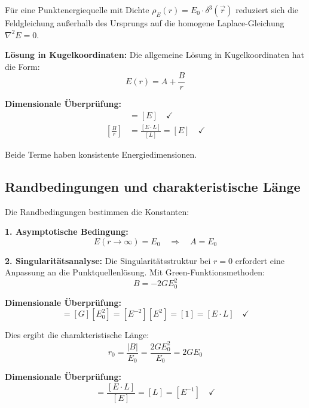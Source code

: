 \documentclass[12pt,a4paper]{report}
\newcommand{\rzero}{r_0}                  %
\begin{document}
	Für eine Punktenergiequelle mit Dichte $\rho_E(r) = E_0 \cdot \delta^3(\vec{r})$ reduziert sich die Feldgleichung außerhalb des Ursprungs auf die homogene Laplace-Gleichung $\nabla^2 E = 0$.
	
	\textbf{Lösung in Kugelkoordinaten:}
	Die allgemeine Lösung in Kugelkoordinaten hat die Form:
	\begin{equation}
		E(r) = A + \frac{B}{r}
		\label{eq:general_solution}
	\end{equation}
	
	\textbf{Dimensionale Überprüfung:}
	\begin{align}
		[A] &= [E] \quad \checkmark \\
		\left[\frac{B}{r}\right] &= \frac{[E \cdot L]}{[L]} = [E] \quad \checkmark
	\end{align}
	
	Beide Terme haben konsistente Energiedimensionen.
	
	\subsection{Randbedingungen und charakteristische Länge}
	\label{subsec:boundary_conditions}
	
	Die Randbedingungen bestimmen die Konstanten:
	
	\textbf{1. Asymptotische Bedingung:}
	\begin{equation}
		E(r \to \infty) = E_0 \quad \Rightarrow \quad A = E_0
	\end{equation}
	
	\textbf{2. Singularitätsanalyse:}
	Die Singularitätsstruktur bei $r = 0$ erfordert eine Anpassung an die Punktquellenlösung. Mit Green-Funktionsmethoden:
	\begin{equation}
		B = -2GE_0^2
	\end{equation}
	
	\textbf{Dimensionale Überprüfung:}
	\begin{equation}
		[B] = [G][E_0^2] = [E^{-2}][E^2] = [1] = [E \cdot L] \quad \checkmark
	\end{equation}
	
	Dies ergibt die charakteristische Länge:
	\begin{equation}
		\boxed{\rzero = \frac{|B|}{E_0} = \frac{2GE_0^2}{E_0} = 2GE_0}
	\end{equation}
	
	\textbf{Dimensionale Überprüfung:}
	\begin{equation}
		[\rzero] = \frac{[E \cdot L]}{[E]} = [L] = [E^{-1}] \quad \checkmark
	\end{equation}
	
\end{document}
